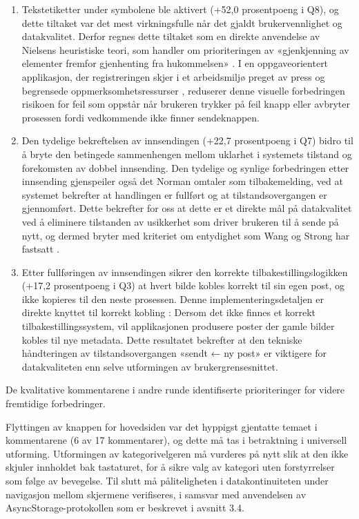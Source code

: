 \begin{enumerate}
    \item Tekstetiketter under symbolene ble aktivert (+52,0 prosentpoeng i Q8), og dette tiltaket var det mest virkningsfulle når det gjaldt brukervennlighet og datakvalitet. Derfor regnes dette tiltaket som en direkte anvendelse av Nielsens heuristiske teori, som handler om prioriteringen av «gjenkjenning av elementer fremfor gjenhenting fra hukommelsen» \cite{nielsen1994}. I en oppgaveorientert applikasjon, der registreringen skjer i et arbeidsmiljø preget av press og begrensede oppmerksomhetsressurser \cite{muller2024, weichbroth2024}, reduserer denne visuelle forbedringen risikoen for feil som oppstår når brukeren trykker på feil knapp eller avbryter prosessen fordi vedkommende ikke finner sendeknappen.

    \item Den tydelige bekreftelsen av innsendingen (+22,7 prosentpoeng i Q7) bidro til å bryte den betingede sammenhengen mellom uklarhet i systemets tilstand og forekomsten av dobbel innsending. Den tydelige og synlige forbedringen etter innsending gjenspeiler også det Norman \cite{norman2013} omtaler som tilbakemelding, ved at systemet bekrefter at handlingen er fullført og at tilstandsovergangen er gjennomført. Dette bekrefter for oss at dette er et direkte mål på datakvalitet ved å eliminere tilstanden av usikkerhet som driver brukeren til å sende på nytt, og dermed bryter med kriteriet om entydighet som Wang og Strong har fastsatt \cite{wang1996}.

    \item Etter fullføringen av innsendingen sikrer den korrekte tilbakestillingslogikken (+17,2 prosentpoeng i Q3) at hvert bilde kobles korrekt til sin egen post, og ikke kopieres til den neste prosessen. Denne implementeringsdetaljen er direkte knyttet til korrekt kobling \cite{wang1996}: Dersom det ikke finnes et korrekt tilbakestillingssystem, vil applikasjonen produsere poster der gamle bilder kobles til nye metadata. Dette resultatet bekrefter at den tekniske håndteringen av tilstandsovergangen «sendt ← ny post» er viktigere for datakvaliteten enn selve utformingen av brukergrensesnittet.
\end{enumerate}

De kvalitative kommentarene i andre runde identifiserte prioriteringer for videre fremtidige forbedringer.

Flyttingen av knappen for hovedsiden var det hyppigst gjentatte temaet i kommentarene (6 av 17 kommentarer), og dette må tas i betraktning i universell utforming. Utformingen av kategorivelgeren må vurderes på nytt slik at den ikke skjuler innholdet bak tastaturet, for å sikre valg av kategori uten forstyrrelser som følge av bevegelse. Til slutt må påliteligheten i datakontinuiteten under navigasjon mellom skjermene verifiseres, i samsvar med anvendelsen av AsyncStorage-protokollen som er beskrevet i avsnitt 3.4.

